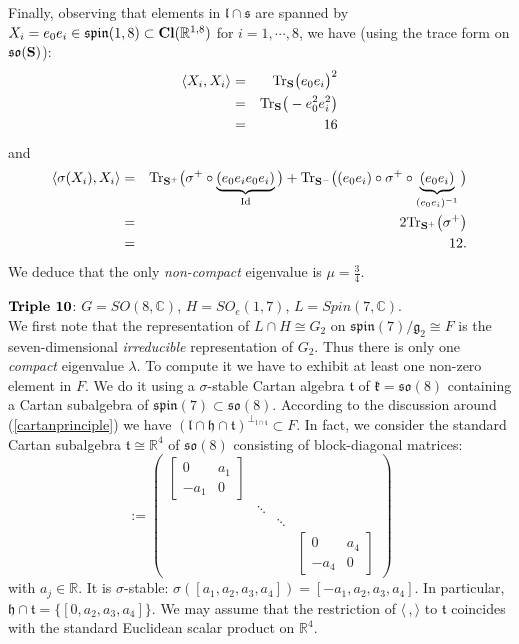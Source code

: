 \documentclass[10]{amsart}
\theoremstyle{remark}
\theoremstyle{definition}
\numberwithin{equation}{section}
\newcommand{\R}{\mathbb{R}}           %
\newcommand{\fg}{{\mathfrak g}}
\newcommand{\fspin}{{\mathfrak{spin}}}
\newcommand{\fh}{{\mathfrak h}}
\newcommand{\fk}{{\mathfrak k}}
\newcommand{\fl}{{\mathfrak l}}
\newcommand{\fo}{{\mathfrak{so}}}
\newcommand{\ft}{{\mathfrak t}}
\newcommand{\IP}[2]{\langle#1\,, #2\rangle}     %
\begin{document}
{Finally, observing that elements in ${\mathfrak l}\cap{\mathfrak s}$ are spanned by $X_i=e_0e_i\in \fspin(1,8)\subset{\bf Cl}({\mathbb R}^{1,8})$ for $i=1,\cdots,8$, we have (using the trace form on $\fo({\bf S})$): 
%
\begin{eqnarray*}
\langle X_i,X_i\rangle&=&\text{Tr}_{{\bf S}}\big(e_0e_i\big)^2\\
&=&\text{Tr}_{{\bf S}}\big(-e_0^2e_i^2\big)\\
&=&16
\end{eqnarray*}
% 
and
%
\begin{eqnarray*}
\langle \sigma(X_i),X_i\rangle&=&\text{Tr}_{{\bf S}^+}\big(\sigma^+\circ \underbrace{(e_0 e_i e_0 e_i)}_{\text{Id}}\big)+\text{Tr}_{{\bf S}^-}\big((e_0 e_i )\circ\sigma^+\circ\underbrace{(e_0 e_i)}_{(e_0 e_i)^{-1}}\big)\\
&=&2\text{Tr}_{{\bf S}^+}\big(\sigma^+\big)\\
&=&12.
\end{eqnarray*}
% 
We deduce that the only {\it non-compact} eigenvalue is $\mu=\frac{3}{4}$.
\vspace*{0.3cm}

\underline{$\text{\bf Triple 10}$}: $G=SO(8,\mathbb{C})$, $H=SO_e(1,7)$, $L=Spin(7,{\mathbb C})$.\\
We first note that the representation of $L\cap H\cong G_2$ on $\fspin(7)/\fg_2\cong F$ is the seven-dimensional {\it irreducible} representation of $G_2$.
Thus there is only one {\it compact} eigenvalue $\lambda$. To compute it we have to exhibit at least one non-zero element in $F$. We do it using a $\sigma$-stable Cartan algebra $\ft$
of $\fk=\fo(8)$ containing a Cartan subalgebra of $\fspin(7)\subset\fo(8)$. According to the discussion around (\ref{cartanprinciple}) we have $(\fl\cap\fh\cap\ft)^{\perp_{\fl\cap\ft}}\subset F$.
In fact, we consider the standard Cartan subalgebra ${\mathfrak t}\cong\R^4$ of $\fo(8)$ consisting of block-diagonal matrices:
%
\begin{equation*}
[a_1,a_2,a_3,a_4]:=\left(\begin{array}{cccccc}
\left[\begin{array}{cc}
0 & a_1\\
-a_1 & 0
\end{array}\right] &  &  &  \\
 & \ddots\\
 &  & \ddots \\
 &  &  & \left[\begin{array}{cc}
0 & a_4\\
-a_4 & 0
\end{array}\right]
\end{array}\right)
\end{equation*}
%
with $a_j\in{\mathbb R}$. It is $\sigma$-stable: $\sigma([a_1,a_2,a_3,a_4])=[-a_1,a_2,a_3,a_4]$. In particular, ${\mathfrak h}\cap {\mathfrak t}=\Big\{[0,a_2,a_3,a_4]\Big\}$.
We may assume that the restriction of $\IP{}{}$ to $\ft$ coincides with the standard Euclidean scalar product on $\R^4$. 

}
\end{document}
